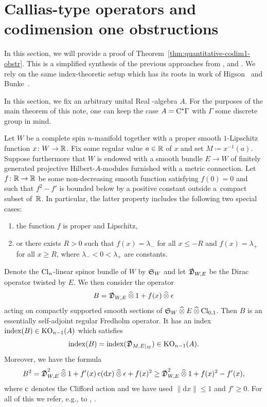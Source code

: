 \documentclass[pdftex]{sigma}
\numberwithin{equation}{section}
\begin{document}
\section{Callias-type operators and codimension one obstructions} \label{sec:codim-1-obstr}
In this section, we will provide a proof of Theorem~\ref{thm:quantitative-codim1-obstr}.
This is a simplified synthesis of the previous approaches from \cite{Cecchini:CalliasTypePSC}, \cite[Section~6]{Cecchini:LongNeck} and \cite[Section~2]{Zeidler:band-width-estimates}.
We rely on the same index-theoretic setup which has its roots in work of Higson~\cite{Higson:CobordismInvariance} and Bunke~\cite{Bunke:RelativeIndexCallias}.

In this section, we fix an arbitrary unital Real \textCstar-algebra \(A\).
For the purposes of the main theorem of this note, one can keep the case \(A = \mathrm{C}^\ast \Gamma\) with \(\Gamma\) some discrete group in mind.

Let \(W\) be a complete spin \(n\)-manifold together with a proper smooth \(1\)-Lipschitz function \(x \colon W \to \mathbb{R}\).
Fix some regular value \(a \in \mathbb{R}\) of \(x\) and set \(M \coloneqq x^{-1}(a)\).
Suppose furthermore that \(W\) is endowed with a smooth bundle \(E \to W\) of finitely generated projective Hilbert-\(A\)-modules furnished with a metric connection.
Let \(f \colon \mathbb{R} \to \mathbb{R}\) be some non-decreasing smooth function satisfying \(f(0) = 0\) and such that \(f^2 - f'\) is bounded below by a positive constant outside a~compact subset of~\(\mathbb{R}\).
In particular, the latter property includes the following two special cases:
\begin{enumerate}\itemsep=0pt
 \item[(i)] the function \(f\) is proper and Lipschitz,
 \item[(ii)] or there exists \(R > 0\) such that \(f(x) = \lambda_-\) for all \(x \leq -R\) and \(f(x) = \lambda_+\) for all \(x \geq R\), where \(\lambda_- < 0 < \lambda_+\) are constants.
\end{enumerate}
Denote the \(\mathrm{Cl}_n\)-linear spinor bundle of \(W\) by \(\mathfrak{S}_W\) and let \(\slashed{\mathfrak{D}}_{W,E}\) be the Dirac operator twisted by \(E\).
We then consider the operator
\[
 B = \slashed{\mathfrak{D}}_{W, E} \mathbin{\widehat{\otimes}} 1 + f(x) \mathbin{\widehat{\otimes}} \epsilon
\]
acting on compactly supported smooth sections of \(\mathfrak{S}_W \mathbin{\widehat{\otimes}} E \mathbin{\widehat{\otimes}} \mathrm{Cl}_{0,1}\).
Then \(B\) is an essentially self-adjoint regular Fredholm operator.
It has an index \(\operatorname{index}(B) \in \operatorname{KO}_{n-1}(A)\) which satisfies
\[
 \operatorname{index}(B) = \operatorname{index}(\slashed{\mathfrak{D}}_{M, E|_M}) \in \operatorname{KO}_{n-1}(A).
\]
Moreover, we have the formula
\begin{equation}
B^2 = \slashed{\mathfrak{D}}^2_{W,E} \mathbin{\widehat{\otimes}} 1 + f'(x) \operatorname{c}(\mathop{}\!\mathrm{d} x) \mathbin{\widehat{\otimes}} \epsilon + f(x)^2 \geq \slashed{\mathfrak{D}}^2_{W,E} \mathbin{\widehat{\otimes}} 1 + f(x)^2 - f'(x),
\label{eq:callias-estimate}
\end{equation}
where \(\operatorname{c}\) denotes the Clifford action and we have used \(\|\mathrm{d} x\| \leq 1\) and \(f' \geq 0\).
For all of this we refer, e.g., to \cite[Section~6]{Cecchini:LongNeck}, \cite[Appendix~A]{Zeidler:band-width-estimates}.
\end{document}
